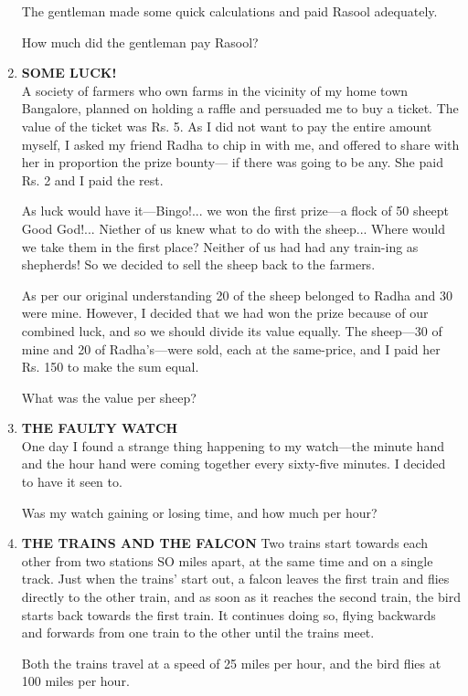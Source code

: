 \documentclass[12pt]{article}
\begin{document}
\begin{enumerate}
The gentleman  made  some  quick  calculations  and paid Rasool  adequately. 

How  much  did the gentleman  pay Rasool? 
%
\item \textbf{SOME  LUCK!} \\
A society  of farmers  who  own  farms  in the vicinity  of my home  town  Bangalore,  planned  on holding  a raffle and persuaded  me to buy a ticket.  The  value  of the ticket was Rs. 5. As  I did not want  to pay  the entire  amount myself,  I asked  my friend  Radha  to chip  in with  me,  and offered  to share  with  her in proportion  the prize  bounty— if there  was  going  to be any.  She  paid  Rs. 2 and  I paid the rest. 

As luck  would  have  it—Bingo!...  we won  the first prize—a  flock  of 50 sheept  Good  God!...  Niether  of us knew  what  to do with  the sheep...  Where  would  we take them  in the first  place?  Neither  of us had had any  train-ing as shepherds!  So  we decided  to sell the sheep  back to the farmers. 

As per  our  original  understanding  20 of the  sheep belonged  to Radha  and 30 were  mine. However,  I decided  that  we had won  the prize  because of our  combined  luck,  and  so we should  divide  its value equally. The sheep—30  of mine  and 20 of Radha's—were  sold, each at the same-price,  and I paid  her  Rs.  150  to make the sum  equal. 

What  was  the value  per sheep? 
%
\item \textbf{THE  FAULTY  WATCH} \\
One day  I found  a strange  thing  happening  to my watch—the  minute  hand  and the hour  hand  were  coming together  every  sixty-five  minutes.  I decided  to have  it seen to. 

Was my watch  gaining  or losing  time,  and  how  much per hour? 
%
\item \textbf{THE  TRAINS  AND  THE  FALCON} 
Two trains  start  towards  each  other  from  two stations SO miles  apart,  at the same  time  and  on a single  track. Just when  the trains'  start  out,  a falcon  leaves  the first train and flies  directly  to the other  train,  and as soon  as it reaches  the second  train,  the bird  starts  back  towards  the first train.  It continues  doing  so, flying  backwards  and forwards  from  one  train  to the  other  until  the trains meet. 

Both  the trains  travel  at a speed  of 25 miles  per  hour, and the bird  flies  at 100  miles  per hour. 


\end{enumerate}
\end{document}
